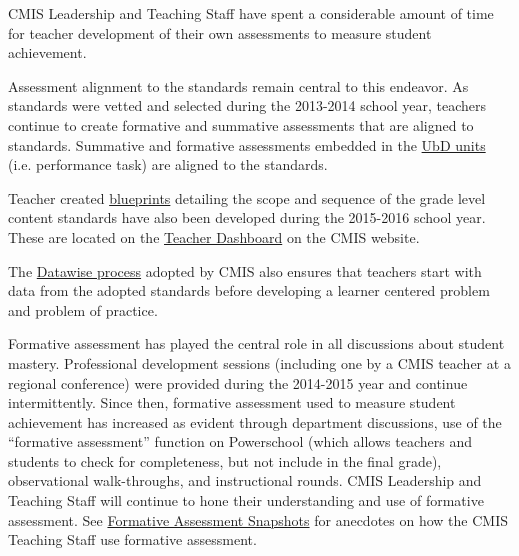 \begin{findings}
CMIS Leadership and Teaching Staff have spent a considerable amount of time for teacher development of their own assessments to measure student achievement. 

Assessment alignment to the standards remain central to this endeavor.  As standards were vetted and selected during the 2013-2014 school  year, teachers continue to create formative and summative assessments that are aligned to standards. Summative and formative assessments embedded in the \href{https://docs.google.com/a/cmis.ac.th/document/d/1kL1VjwfuMMa7NaWmwUrEah1BM-jJRmLAd4VJzR3HoPs/edit?usp=sharing}{UbD units} (i.e. performance task) are aligned to the standards. 

Teacher created \href{https://drive.google.com/drive/folders/0ByVFfrm0zfolfmV1QTNuWFdUVHV3dDVrRFMzUFBMazY0VGs1eWc0cmFjVGcwNDdsQkdrZzA?usp=sharing}{blueprints} detailing the scope and sequence of the grade level content standards have also been developed during the 2015-2016 school year. These are located on the \href{http://www.cmis.ac.th/}{Teacher Dashboard} on the CMIS website. 

The \href{https://drive.google.com/drive/folders/0ByVFfrm0zfolMkE4OEhyVHBNbmM?usp=sharing}{Datawise process} adopted by CMIS also ensures that teachers start with data from the adopted standards before developing a learner centered problem and problem of practice. 

Formative assessment has played the central role in all discussions about student mastery. Professional development sessions (including one by a CMIS teacher at a regional conference) were provided during the 2014-2015 year and continue intermittently. Since then, formative assessment used to measure student achievement has increased as evident through department discussions, use of the “formative assessment” function on Powerschool (which allows teachers and students to check for completeness, but not include in the final grade), observational walk-throughs, and instructional rounds. CMIS Leadership and Teaching Staff will continue to hone their understanding and use of formative assessment. See \href{https://docs.google.com/a/cmis.ac.th/document/d/1yPhINDe21ApcJp3psbSCgmS9PHEBbxrCflrR2Adnwho/edit?usp=sharing}{Formative Assessment Snapshots} for anecdotes on how the CMIS Teaching Staff use formative assessment. 


\end{findings}
